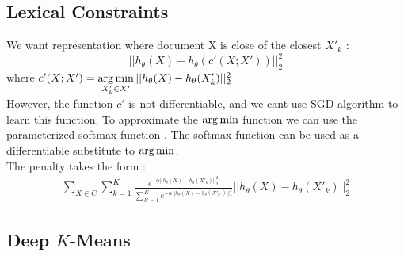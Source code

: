 \subsection{Lexical Constraints}
We want representation where document X is close of the closest
$X'_k$ : 
\begin{equation}
|| h_\theta(X) - h_\theta(c'(X ; X' )) ||_2^2
\end{equation}
where $c'(X ; X') = \operatorname*{arg\,min}\limits_{X'_k \in X'} ||h_\theta(X) - h_\theta(X'_k) ||_2^2$\\ 
However, the  function $c'$ is not differentiable, and we cant use SGD algorithm
\cite{doi:10.1080/01621459.1982.10477894}
to learn this function. To approximate the $\operatorname*{arg\,min}$ function we can use the 
parameterized softmax function \cite{doi:10.1117/1.2819119}. The softmax 
function can be used as a differentiable substitute to $\operatorname*{arg\,min}$. 
\\The penalty takes the form : 
\begin{equation}\label{eq:omega_kw_soft}
\begin{array}{l}
  \sum\limits_{X \in C} \sum\limits_{k = 1}^K \frac{e^{-\alpha|| h_\theta(X) - 
h_\theta(X'_k)||_2^2}}{\sum\limits_{k' = 1}^K e^{-\alpha|| h_\theta(X) - 
h_\theta(X'_{k'})||_2^2}}|| h_\theta(X) - h_\theta(X'_{k})||_2^2
\end{array}
\end{equation}

\subsection{Deep $K$-Means}

